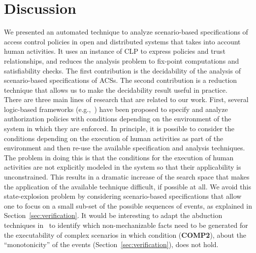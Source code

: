 \documentclass[conference]{llncs}
\begin{document}
{\section{Discussion}
\label{sec:conclusions}
We presented an automated technique to analyze scenario-based
specifications of access control policies in open and distributed
systems that takes into account human activities.  It uses an instance
of CLP to express policies and trust relationships, and reduces the
analysis problem to fix-point computations and satisfiability checks.
The first contribution is the decidability of the analysis of
scenario-based specifications of ACSs.  The second contribution is a
reduction technique that allows us to make the decidability result
useful in practice.\\






There are three main lines of research that are related to our work. 
First, several logic-based frameworks
(e.g.,~\cite{lietal2005,GurevichNeeman-dkal,becker,hurlin,asiaccs11,jsc-ftp09})
have been proposed to specify and analyze authorization policies with
conditions depending on the environment of the system in which they
are enforced.  In principle, it is possible to consider the conditions
depending on the execution of human activities as part of the
environment and then re-use the available specification and analysis
techniques.  The problem in doing this is that the conditions for the
execution of human activities are not explicitly modeled in the
system so that their applicability is unconstrained. This results in
a dramatic increase of the search space that makes the application of
the available technique difficult, if possible at all.  We avoid this
state-explosion problem by considering scenario-based specifications
that allow one to focus on a small sub-set of the possible sequences of
events, as explained in Section~\ref{sec:verification}.  It would be
interesting to adapt the abduction techniques
in~\cite{becker-abd,hurlin} to identify which non-mechanizable facts
need to be generated for the executability of complex scenarios in
which condition (\textbf{COMP2}), about the ``monotonicity'' of the
events (Section~\ref{sec:verification}), does not hold.

}
\end{document}
